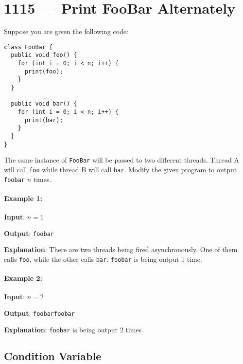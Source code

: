 \section{1115 --- Print FooBar Alternately}
Suppose you are given the following code:

\begin{lstlisting}[style=customc]
class FooBar {
  public void foo() {
    for (int i = 0; i < n; i++) {
      print(foo);
    }
  }

  public void bar() {
    for (int i = 0; i < n; i++) {
      print(bar);
    }
  }
}
\end{lstlisting}

The same instance of \texttt{FooBar} will be passed to two different threads. Thread A will call \texttt{foo} while thread B will call \texttt{bar}. Modify the given program to output \texttt{foobar} $n$ times.

\paragraph{Example 1:}

\begin{flushleft}
\textbf{Input}: $ n = 1 $

\textbf{Output}: \texttt{foobar}

\textbf{Explanation}: There are two threads being fired asynchronously. One of them calls \texttt{foo}, while the other calls \texttt{bar}. \texttt{foobar} is being output 1 time.

\end{flushleft}

\paragraph{Example 2:}

\begin{flushleft}
\textbf{Input}: $ n = 2 $

\textbf{Output}: \texttt{foobarfoobar}

\textbf{Explanation}: \texttt{foobar} is being output 2 times.
\end{flushleft}

\subsection{Condition Variable}

